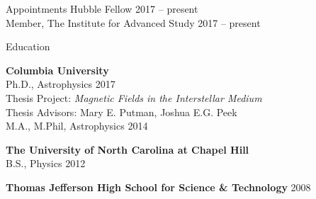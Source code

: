 \documentclass{resume_clark} %
\begin{document}

\begin{rSection}{Appointments}
Hubble Fellow \hfill{2017 -- present}\\
Member, The Institute for Advanced Study \hfill{2017 -- present}
\end{rSection}


\begin{rSection}{Education}

{\bf Columbia University}  \\ 
Ph.D., Astrophysics  \hfill {2017}  \\
\hspace*{0.5cm}Thesis Project: {\em Magnetic Fields in the Interstellar Medium}\\
\hspace*{0.5cm}Thesis Advisors: Mary E. Putman, Joshua E.G. Peek\\
M.A., M.Phil, Astrophysics \hfill {2014}  \\

\vspace{-0.3cm}

{\bf The University of North Carolina at Chapel Hill}\\ 
B.S., Physics \hfill {2012}\\

\vspace{-0.3cm}

{\bf Thomas Jefferson High School for Science \& Technology} \hfill {2008}\\

\end{rSection}

\end{document}
